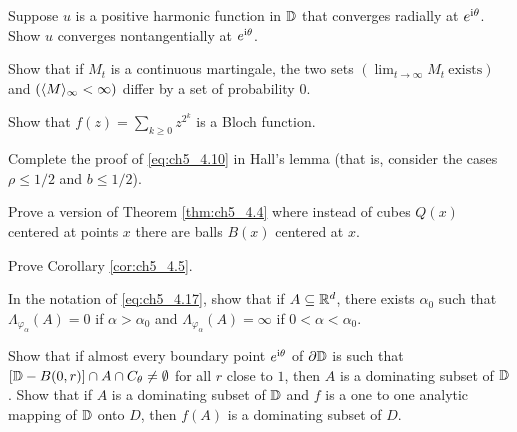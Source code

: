 \mnewpage

\begin{exercise}\label{ex:ch5_7}
Suppose $u$ is a positive harmonic function in $\mathbb{D}$ that converges radially at $e^{\mathrm{i}\theta}$. Show $u$ converges nontangentially at $e^{\mathrm{i}\theta}$.
\end{exercise}

\begin{exercise}\label{ex:ch5_8}
Show that if $M_t$ is a continuous martingale, the two sets $(\lim_{t\to\infty} M_t~\text{exists})$ and $(\langle M \rangle_\infty < \infty)$ differ by a set of probability $0$.
\end{exercise}

\begin{exercise}\label{ex:ch5_9}
Show that $f(z) = \sum_{k\geq 0} z^{2^k}$ is a Bloch function.
\end{exercise}

\begin{exercise}\label{ex:ch5_10}
Complete the proof of \eqref{eq:ch5_4.10} in Hall's lemma (that is, consider the cases $\rho \leq 1/2$ and $b \leq 1/2$).
\end{exercise}

\begin{exercise}\label{ex:ch5_11}
Prove a version of Theorem \ref{thm:ch5_4.4} where instead of cubes $Q(x)$ centered at points $x$ there are balls $B(x)$ centered at $x$.
\end{exercise}

\begin{exercise}\label{ex:ch5_12}
Prove Corollary \ref{cor:ch5_4.5}.
\end{exercise}

\begin{exercise}\label{ex:ch5_13}
In the notation of \eqref{eq:ch5_4.17}, show that if $A \subseteq \mathbb{R}^d$, there exists $\alpha_0$ such that $\Lambda_{\varphi_\alpha}(A) = 0$ if $\alpha > \alpha_0$ and $\Lambda_{\varphi_\alpha}(A) = \infty$ if $0 < \alpha < \alpha_0$.
\end{exercise}

\begin{exercise}\label{ex:ch5_14}
Show that if almost every boundary point $e^{\mathrm{i}\theta}$ of $\partial\mathbb{D}$ is such that $[\mathbb{D} - B(0,r)] \cap A \cap C_\theta \neq \emptyset$ for all $r$ close to $1$, then $A$ is a dominating subset of $\mathbb{D}$. Show that if $A$ is a dominating subset of $\mathbb{D}$ and $f$ is a one to one analytic mapping of $\mathbb{D}$ onto $D$, then $f(A)$ is a dominating subset of $D$.
\end{exercise}

